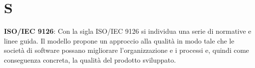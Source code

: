 \section{S}
\textbf{ISO/IEC 9126}: Con la sigla ISO/IEC 9126 si individua una serie di normative e linee guida. Il modello propone un approccio alla qualità in modo tale che le società di software possano migliorare l'organizzazione e i processi e, quindi come conseguenza concreta, la qualità del prodotto sviluppato.\\
